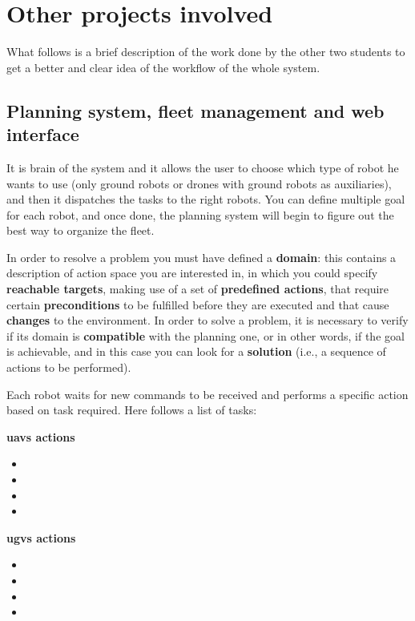 \section{Other projects involved}

What follows is a brief description of the work done by the other two students to get a better and clear idea of the workflow of the whole system.

\subsection{Planning system, fleet management and web interface}
\label{sub:planning}

It is brain of the system and it allows the user to choose which type of robot he wants to use (only ground robots or drones with ground robots as auxiliaries), and then it dispatches the tasks to the right robots. You can define multiple goal for each robot, and once done, the planning system will begin to figure out the best way to organize the fleet.

In order to resolve a problem you must have defined a \textbf{domain}: this contains a description of action space you are interested in, in which you could specify \textbf{reachable targets}, making use of a set of \textbf{predefined actions}, that require certain \textbf{preconditions} to be fulfilled before they are executed and that cause \textbf{changes} to the environment. In order to solve a problem, it is necessary to verify if its domain is \textbf{compatible} with the planning one, or in other words, if the goal is achievable, and in this case you can look for a \textbf{solution} (i.e., a sequence of actions to be performed).

Each robot waits for new commands to be received and performs a specific action based on task required. Here follows a list of tasks:

\bigskip

\begin{minipage}[h]{0.45\textwidth}
  \centering
  \textbf{\acrshort{uavs} actions}
  \begin{itemize}
    \centering
    \item {}
    \item {}    
    \item {}
    \item {}
  \end{itemize}
\end{minipage}
\begin{minipage}[h]{0.45\textwidth}
  \centering
  \textbf{\acrshort{ugvs} actions}
    \begin{itemize}
      \centering
      \item {}
      \item {}
      \item {}
      \item {}
    \end{itemize}
\end{minipage}

